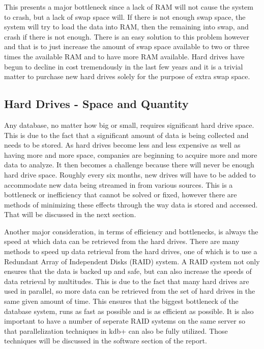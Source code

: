 This presents a major bottleneck since a lack of RAM will not cause the system to crash, but a lack of swap space will.  If there is not enough swap space, the system will try to load the data into RAM, then the remaining into swap, and crash if there is not enough.  There is an easy solution to this problem however and that is to just increase the amount of swap space available to two or three times the available RAM and to have more RAM available.  Hard drives have begun to decline in cost tremendously in the last few years and it is a trivial matter to purchase new hard drives solely for the purpose of extra swap space.\newline

\subsection{Hard Drives - Space and Quantity} %
\label{sub:hard_drives}
Any database, no matter how big or small, requires significant hard drive space.  This is due to the fact that a significant amount of data is being collected and needs to be stored.  As hard drives become less and less expensive as well as having more and more space, companies are beginning to acquire more and more data to analyze.  It then becomes a challenge because there will never be enough hard drive space.  Roughly every six months, new drives will have to be added to accommodate new data being streamed in from various sources.  This is a bottleneck or inefficiency that cannot be solved or fixed, however there are methods of minimizing these effects through the way data is stored and accessed.  That will be discussed in the next section.\newline

Another major consideration, in terms of efficiency and bottlenecks, is always the speed at which data can be retrieved from the hard drives.  There are many methods to speed up data retrieval from the hard drives, one of which is to use a Redundant Array of Independent Disks (RAID) system.  A RAID system not only ensures that the data is backed up and safe, but can also increase the speeds of data retrieval by multitudes.  This is due to the fact that many hard drives are used in parallel, so more data can be retrieved from the set of hard drives in the same given amount of time.  This ensures that the biggest bottleneck of the database system, runs as fast as possible and is as efficient as possible.  It is also important to have a number of seperate RAID systems on the same server so that parallelization techniques in kdb+ can also be fully utilized.  Those techniques will be discussed in the software section of the report.\newline

